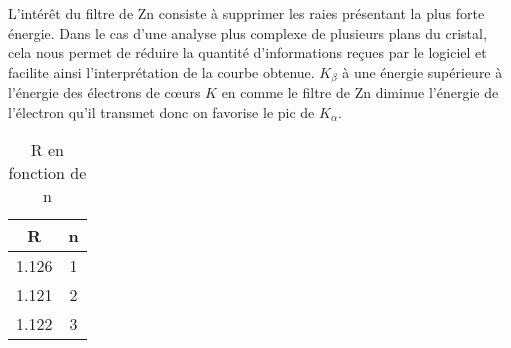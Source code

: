 \begin{flushleft}
L'intérêt du filtre de Zn consiste à supprimer les raies présentant la plus forte énergie. Dans le cas d'une analyse plus complexe de plusieurs plans du cristal, cela nous permet de réduire la quantité d'informations reçues par le logiciel et facilite ainsi l'interprétation de la courbe obtenue. 
$K_{\beta}$ à une énergie supérieure à l'énergie des électrons de cœurs $ K $ en comme le filtre de Zn diminue l'énergie de l'électron qu'il transmet donc on favorise le pic de $K_{\alpha}$.

\begin{table}[h!]
	\centering
	\begin{tabular}{|c|c|}
		\hline
		R & n \\ \hline
		1.126 & 1 \\ \hline
		1.121& 2 \\ \hline
		1.122& 3 \\ \hline
	\end{tabular}
	\caption{R en fonction de n}
	\label{tab:R en fonction de n}
\end{table}


\end{flushleft}
